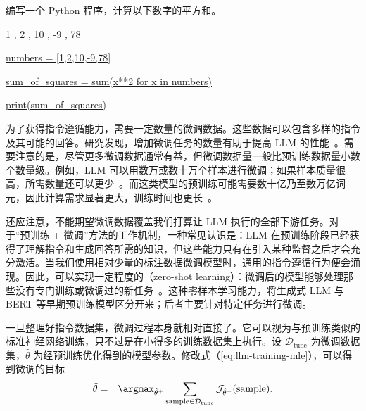 \vspace{0.5em}
\begin{tcolorbox}
\begin{center}
\parbox{0.9\textwidth}
{
{\color{blue} 编写一个 Python 程序，计算以下数字的平方和。}

{\color{blue} 1 , 2 , 10 , -9 , 78}

\vspace{0.3em}

\underline{numbers = [1,2,10,-9,78]}

\underline{sum\_of\_squares = sum(x**2 for x in numbers)}

\underline{print(sum\_of\_squares)}
}
\end{center}
\end{tcolorbox}
\vspace{0.5em}

为了获得指令遵循能力，需要一定数量的微调数据。这些数据可以包含多样的指令及其可能的回答。研究发现，增加微调任务的数量有助于提高 LLM 的性能~\cite{chung-etal:2022scaling}。需要注意的是，尽管更多微调数据通常有益，但微调数据量一般比预训练数据量小数个数量级。例如，LLM 可以用数万或数十万个样本进行微调；如果样本质量很高，所需数量还可以更少~\cite{zhou-etal:2023lima,chen-etal:2023alpagasus}。而这类模型的预训练可能需要数十亿乃至数万亿词元，因此计算需求显著更大，训练时间也更长~\cite{touvron-etal:2023llama}。

还应注意，不能期望微调数据覆盖我们打算让 LLM 执行的全部下游任务。对于“预训练 + 微调”方法的工作机制，一种常见认识是：LLM 在预训练阶段已经获得了理解指令和生成回答所需的知识，但这些能力只有在引入某种监督之后才会充分激活。当我们使用相对少量的标注数据微调模型时，通用的指令遵循行为便会涌现。因此，可以实现一定程度的（zero-shot learning）：微调后的模型能够处理那些没有专门训练或微调过的新任务~\cite{sanh-etal:2022multitask,wei-etal:2022finetuned}。这种零样本学习能力，将生成式 LLM 与 BERT 等早期预训练模型区分开来；后者主要针对特定任务进行微调。

一旦整理好指令数据集，微调过程本身就相对直接了。它可以视为与预训练类似的标准神经网络训练，只不过是在小得多的训练数据集上执行。设 $\mathcal{D}_{\mathrm{tune}}$ 为微调数据集，$\hat{\theta}$ 为经预训练优化得到的模型参数。修改式（\ref{eq:llm-training-mle}），可以得到微调的目标
\begin{eqnarray}
\tilde{\theta} & = & \argmax_{\hat{\theta}^+} \sum_{\mathrm{sample} \in \mathcal{D}_{\mathrm{tune}}} \mathcal{J}_{\hat{\theta}^+}(\mathrm{sample}) \label{eq:llm-fine-tuning-mle}.
\end{eqnarray}

